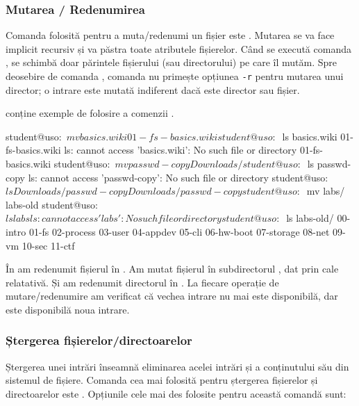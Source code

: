 \subsubsection{Mutarea / Redenumirea}
\label{sec:fs:mv}

Comanda folosită pentru a muta/redenumi un fișier este . Mutarea se va face implicit recursiv și va păstra toate atributele fișierelor. Când se execută comanda , se schimbă doar părintele fișierului (sau directorului) pe care îl mutăm. Spre deosebire de comanda , comanda  nu primește opțiunea \texttt{-r} pentru mutarea unui director; o intrare este mutată indiferent dacă este director sau fișier.

 conține exemple de folosire a comenzii .

\begin{screen}[caption={Mutarea / Redenumirea fișierelor și directoarelor},label={lst:fs:mv}]
student@uso:~$ mv basics.wiki 01-fs-basics.wiki
student@uso:~$ ls basics.wiki 01-fs-basics.wiki
ls: cannot access 'basics.wiki': No such file or directory
01-fs-basics.wiki
student@uso:~$ mv passwd-copy Downloads/
student@uso:~$ ls passwd-copy
ls: cannot access 'passwd-copy': No such file or directory
student@uso:~$ ls Downloads/passwd-copy
Downloads/passwd-copy
student@uso:~$ mv labs/ labs-old
student@uso:~$ ls labs
ls: cannot access 'labs': No such file or directory
student@uso:~$ ls labs-old/
00-intro  01-fs  02-process  03-user  04-appdev  05-cli  06-hw-boot  07-storage  08-net  09-vm  10-sec  11-ctf
\end{screen}

În  am redenumit fișierul  în . Am mutat fișierul  în subdirectorul , dat prin cale relatativă. Și am redenumit directorul  în . La fiecare operație de mutare/redenumire am verificat că vechea intrare nu mai este disponibilă, dar este disponibilă noua intrare.

\subsubsection{Ștergerea fișierelor/directoarelor}
\label{sec:fs:rm}

Ștergerea unei intrări înseamnă eliminarea acelei intrări și a conținutului său din sistemul de fișiere. Comanda cea mai folosită pentru ștergerea fișierelor și directoarelor este
. Opțiunile cele mai des folosite pentru această comandă sunt:

